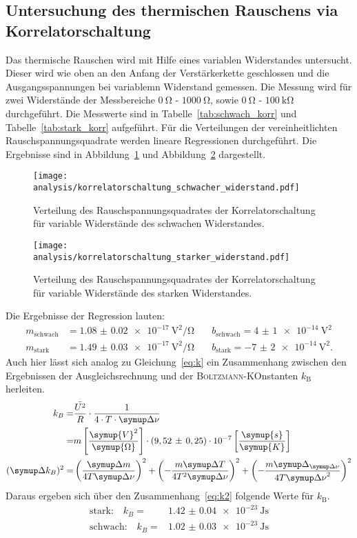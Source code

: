 \subsection{Untersuchung des thermischen Rauschens via Korrelatorschaltung}
%
Das thermische Rauschen wird mit Hilfe eines variablen Widerstandes untersucht. Dieser wird wie oben an den Anfang der Verstärkerkette geschlossen und die Ausgangsspannungen bei variablemn Widerstand gemessen. Die Messung wird für zwei Widerstände der Messbereiche $\SI{0}{\ohm}$ - $\SI{1000}{\ohm}$, sowie $\SI{0}{\ohm}$ - $\SI{100}{\kilo\ohm}$ durchgeführt. Die Messwerte sind in Tabelle~\ref{tab:schwach_korr} und Tabelle~\ref{tab:stark_korr} aufgeführt.
Für die Verteilungen der vereinheitlichten Rauschspannungsquadrate werden lineare Regressionen durchgeführt. Die Ergebnisse sind in Abbildung~\ref{fig:korr_schwach} und Abbildung~\ref{fig:korr_stark} dargestellt.
%
\begin{figure}
  \centering
  \texttt{[image: analysis/korrelatorschaltung\_schwacher\_widerstand.pdf]}
  \caption{Verteilung des Rauschspannungsquadrates der Korrelatorschaltung für variable Widerstände des schwachen Widerstandes.}
  \label{fig:korr_schwach}
\end{figure}
%
\begin{figure}
  \centering
  \texttt{[image: analysis/korrelatorschaltung\_starker\_widerstand.pdf]}
  \caption{Verteilung des Rauschspannungsquadrates der Korrelatorschaltung für variable Widerstände des starken Widerstandes.}
  \label{fig:korr_stark}
\end{figure}
%
Die Ergebnisse der Regression lauten:
%
\begin{align*}
  m_\text{schwach}&=\SI{1.08(2)e-17}{\volt\squared\per\ohm} \quad &b_\text{schwach}=\SI{4(1)e-14}{\volt\squared} \\ m_\text{stark}&=\SI{1.49(3)e-17}{\volt\squared\per\ohm} \quad &b_\text{stark}=\SI{-7(2)e-14}{\volt\squared}.
\end{align*}
%
Auch hier lässt sich analog zu Gleichung~\eqref{eq:k} ein Zusammenhang zwischen den Ergebnissen der Ausgleichsrechnung und der \textsc{Boltzmann}-KOnstanten $k_\text{B}$ herleiten.
%
\begin{align}
  k_B=&\frac{\bar{U^2}}{R}\cdot\frac{1}{4\cdot T\cdot\upD\nu} \\
     \nonumber=&m\left[\frac{\symup{V}^2}{\symup{\Omega}}\right]\cdot(9,52\,\pm\,0,25)\cdot10^{-7}\left[\frac{\symup{s}}{\symup{K}}\right] \\
  (\upD k_B)^2=&\left(\frac{\upD m}{4T\upD\nu}\right)^2+\left(-\frac{m\upD T}{4T^2\upD\nu}\right)^2+\left(-\frac{m\upD_{\upD\nu}}{4T{\upD\nu}^2}\right)^2
  \label{eq:k2}
\end{align}
%
Daraus ergeben sich über den Zusammenhang~\eqref{eq:k2} folgende Werte für $k_\text{B}$.
%
\begin{align}
  \text{stark:}\quad k_{B}=&\SI{1.42(4)e-23}{\joule\second} \\
  \text{schwach:}\quad k_{B}=&\SI{1.02(3)e-23}{\joule\second}
\end{align}
%
